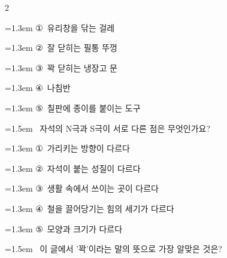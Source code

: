 \documentclass[12pt, a4paper]{article}
\begin{document}
\begin{multicols}{2}
\begin{minipage}{\columnwidth}
\vspace{0.5mm}
{\hangindent=1.3em  \noindent\hspace{0.3em}①~유리창을 닦는 걸레\par}
{\hangindent=1.3em  \noindent\hspace{0.3em}②~잘 닫히는 필통 뚜껑\par}
{\hangindent=1.3em  \noindent\hspace{0.3em}③~꽉 닫히는 냉장고 문\par}
{\hangindent=1.3em  \noindent\hspace{0.3em}④~나침반\par}
{\hangindent=1.3em  \noindent\hspace{0.3em}⑤~칠판에 종이를 붙이는 도구\par}
\vspace{4mm}
\end{minipage}
\par

\noindent\begin{minipage}{\columnwidth}
\vspace{2mm}
{\hangindent=1.5em  ~자석의 N극과 S극이 서로 다른 점은 무엇인가요?\par}

\vspace{0.5mm}
{\hangindent=1.3em  \noindent\hspace{0.3em}①~가리키는 방향이 다르다\par}
{\hangindent=1.3em  \noindent\hspace{0.3em}②~자석이 붙는 성질이 다르다\par}
{\hangindent=1.3em  \noindent\hspace{0.3em}③~생활 속에서 쓰이는 곳이 다르다\par}
{\hangindent=1.3em  \noindent\hspace{0.3em}④~철을 끌어당기는 힘의 세기가 다르다\par}
{\hangindent=1.3em  \noindent\hspace{0.3em}⑤~모양과 크기가 다르다\par}
\vspace{4mm}
\end{minipage}
\par

\noindent\begin{minipage}{\columnwidth}
\vspace{2mm}
{\hangindent=1.5em  ~이 글에서 '꽉'이라는 말의 뜻으로 가장 알맞은 것은?\par}


\end{minipage}
\end{multicols}
\end{document}
